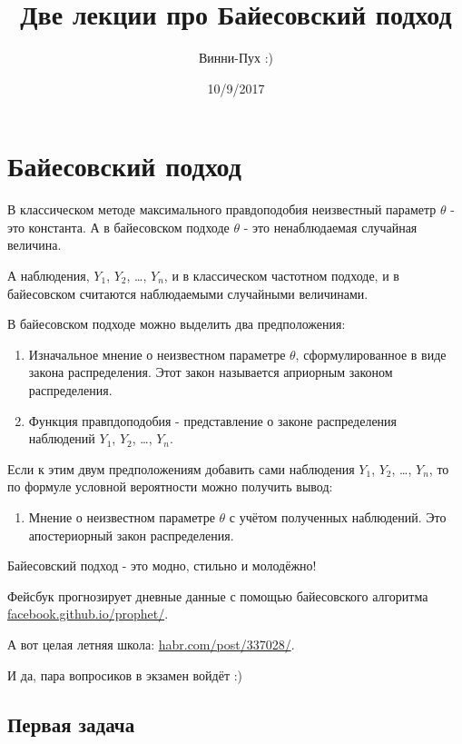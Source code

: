 \documentclass[11pt,russian,]{article}
\title{Две лекции про Байесовский подход}
\author{Винни-Пух :)}
\date{10/9/2017}
\providecommand{\tightlist}{%
  \setlength{\itemsep}{0pt}\setlength{\parskip}{0pt}}
\begin{document}
\maketitle

\section{Байесовский подход}\label{-}

В классическом методе максимального правдоподобия неизвестный параметр
\(\theta\) - это константа. А в байесовском подходе \(\theta\) - это
ненаблюдаемая случайная величина.

А наблюдения, \(Y_1\), \(Y_2\), \ldots, \(Y_n\), и в классическом
частотном подходе, и в байесовском считаются наблюдаемыми случайными
величинами.

В байесовском подходе можно выделить два предположения:

\begin{enumerate}
\def\labelenumi{\arabic{enumi}.}
\item
  Изначальное мнение о неизвестном параметре \(\theta\),
  сформулированное в виде закона распределения. Этот закон называется
  априорным законом распределения.
\item
  Функция правпдоподобия - представление о законе распределения
  наблюдений \(Y_1\), \(Y_2\), \ldots, \(Y_n\).
\end{enumerate}

Если к этим двум предположениям добавить сами наблюдения \(Y_1\),
\(Y_2\), \ldots, \(Y_n\), то по формуле условной вероятности можно
получить вывод:

\begin{enumerate}
\def\labelenumi{\arabic{enumi}.}
\tightlist
\item
  Мнение о неизвестном параметре \(\theta\) с учётом полученных
  наблюдений. Это апостериорный закон распределения.
\end{enumerate}

Байесовский подход - это модно, стильно и молодёжно!

Фейсбук прогнозирует дневные данные с помощью байесовского алгоритма
\href{https://facebook.github.io/prophet/}{facebook.github.io/prophet/}.

А вот целая летняя школа:
\href{https://habr.com/post/337028/}{habr.com/post/337028/}.

И да, пара вопросиков в экзамен войдёт :)

\subsection{Первая задача}\label{-}
\end{document}

